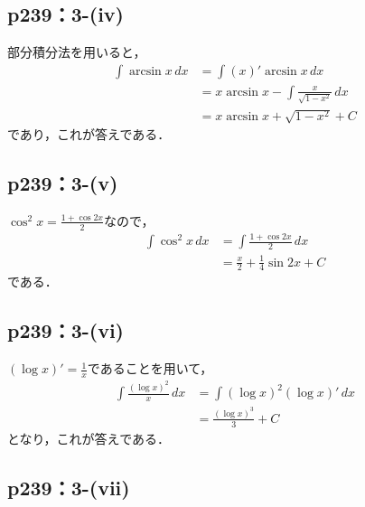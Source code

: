 \documentclass[a4paper,10pt,fleqn]{ltjsarticle}
\begin{document}
\subsection*{p239：3-(iv)}
\begin{leftbar}
    部分積分法を用いると，
    \begin{align*}
        \int \arcsin x \, dx & = \int (x)' \arcsin x \, dx \\
        & = x \arcsin x  - \int \frac{x}{\sqrt{1-x^2}} \, dx \\
        & = x \arcsin x + \sqrt{1-x^2} + C
    \end{align*}
    であり，これが答えである．
\end{leftbar}

\subsection*{p239：3-(v)}

\begin{tleftbar}
    $\cos ^2 x = \frac{1+\cos 2x}{2}$なので，
    \begin{align*}
        \int \cos ^2 x \, dx & = \int \frac{1+\cos 2x}{2} \, dx \\
        & = \frac{x}{2}+\frac{1}{4} \sin 2x + C
    \end{align*}
    である．
\end{tleftbar}

\newpage 

\subsection*{p239：3-(vi)}

\begin{tleftbar}
    $(\log x)' = \frac{1}{x}$であることを用いて，
    \begin{align*}
        \int \frac{(\log x)^2}{x} \, dx & = \int (\log x)^2 (\log x)' \, dx \\
        & = \frac{(\log x)^3}{3} + C
    \end{align*}
    となり，これが答えである．
\end{tleftbar}

\subsection*{p239：3-(vii)}
\end{document}
